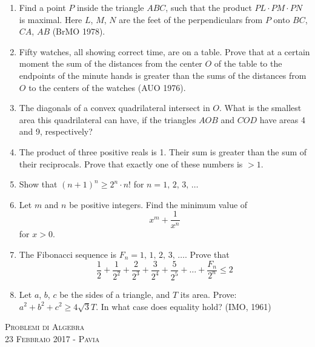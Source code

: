 \documentclass[a4paper]{article}
\theoremstyle{remark}
\theoremstyle{definition}
\begin{document}
\begin{enumerate}
	 \item Find a point $ P $ inside the triangle $ ABC $, such that the product $ P L \cdot P M \cdot P N $ is
	 maximal. Here $ L $, $ M $, $ N $ are the feet of the perpendiculars from $ P $ onto $ BC $, $ CA $,
	 $ AB $ (BrMO 1978).
	 
	 \item Fifty watches, all showing correct time, are on a table. Prove that at a certain moment
	 the sum of the distances from the center $ O $ of the table to the endpoints of the minute
	 hands is greater than the sums of the distances from $ O $ to the centers of the watches
	 (AUO 1976).
	 
	 \item The diagonals of a convex quadrilateral intersect in $ O $. What is the smallest area
	 this quadrilateral can have, if the triangles $ AOB $ and $ COD $ have areas 4 and 9,
	 respectively?
	 
	 \item The product of three positive reals is 1. Their sum is greater than the sum of their
	 reciprocals. Prove that exactly one of these numbers is $ > 1 $.
	 
	 \item Show that $ (n + 1)^n \geq 2^n \cdot n! $ for $ n = 1,\, 2,\, 3,\, \dots $ 
	 
	 \item Let $ m $ and $ n $ be positive integers. Find the minimum value of
	 \[ x^m + \frac{1}{x^n} \]
	 for $ x > 0 $.
	 
	 \item The Fibonacci sequence is $ F_n = 1,\, 1,\, 2,\, 3,\, \dots $. Prove that
	 \[ \frac{1}{2} + \frac{1}{2^2} + \frac{2}{2^3} + \frac{3}{2^4} + \frac{5}{2^5} + \dots + \frac{F_n}{2^n} \leq 2 \]
	 
	 \item Let $ a $, $ b $, $ c $ be the sides of a triangle, and $ T $ its area. Prove: $ a^2+b^2+c^2 \geq 4\sqrt{3}T $. In what case does
	 equality hold? (IMO, 1961)
\end{enumerate}

\newpage
{}
\begin{center}
	\vspace*{0,5 cm}
	{\Huge \textsc{Problemi di Algebra}} \\
	\vspace{0,5 cm}
	\textsc{\Author} \hspace{1cm} \textsc{23 Febbraio 2017 - Pavia}
	\thispagestyle{empty}
	\vspace{0,7 cm}
\end{center}
\normalsize
\end{document}
